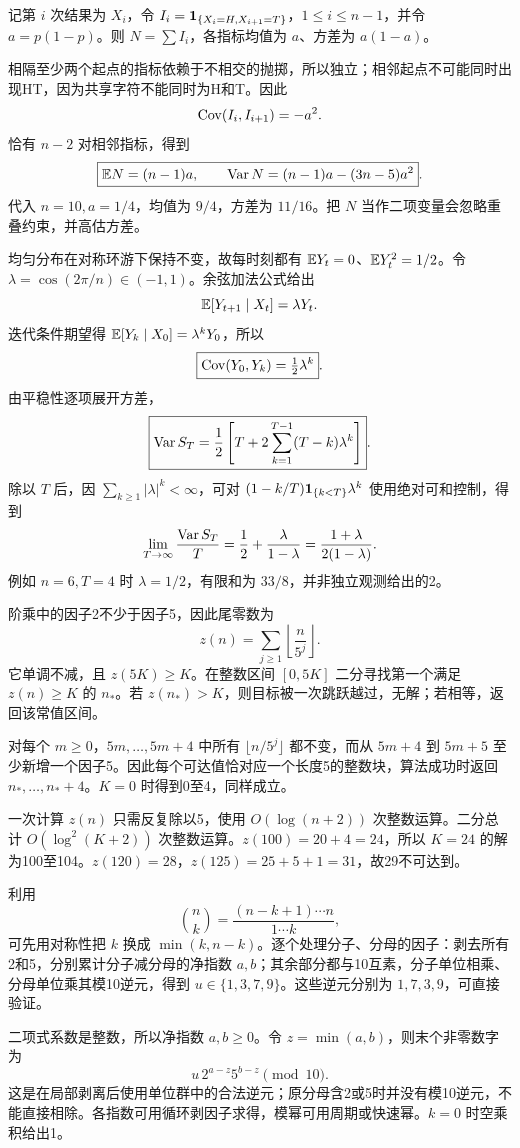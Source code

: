 记第 $i$ 次结果为 $X_i$，令 $I_i=\mathbf{1}_{\{X_i=H,X_{i+1}=T\}}$，$1\le i\le n-1$，并令 $a=p(1-p)$。则 $N=\sum I_i$，各指标均值为 $a$、方差为 $a(1-a)$。

相隔至少两个起点的指标依赖于不相交的抛掷，所以独立；相邻起点不可能同时出现HT，因为共享字符不能同时为H和T。因此
\[
\operatorname{Cov}(I_i,I_{i+1})=-a^2.
\]
恰有 $n-2$ 对相邻指标，得到
\[
\boxed{\mathbb{E} N=(n-1)a,\qquad
\operatorname{Var} N=(n-1)a-(3n-5)a^2}.
\]
代入 $n=10,a=1/4$，均值为 $9/4$，方差为 $11/16$。把 $N$ 当作二项变量会忽略重叠约束，并高估方差。

均匀分布在对称环游下保持不变，故每时刻都有 $\mathbb{E} Y_t=0$、$\mathbb{E} Y_t^2=1/2$。令 $\lambda=\cos(2\pi/n)\in(-1,1)$。余弦加法公式给出
\[
\mathbb{E}[Y_{t+1}\mid X_t]=\lambda Y_t.
\]
迭代条件期望得 $\mathbb{E}[Y_k\mid X_0]=\lambda^kY_0$，所以
\[
\boxed{\operatorname{Cov}(Y_0,Y_k)=\tfrac12\lambda^k}.
\]
由平稳性逐项展开方差，
\[
\boxed{\operatorname{Var} S_T=\frac12\left[T+
2\sum_{k=1}^{T-1}(T-k)\lambda^k\right]}.
\]
除以 $T$ 后，因 $\sum_{k\ge1}|\lambda|^k<\infty$，可对 $(1-k/T)\mathbf{1}_{\{k<T\}}\lambda^k$ 使用绝对可和控制，得到
\[
\lim_{T\to\infty}\frac{\operatorname{Var} S_T}{T}
=\frac12+\frac{\lambda}{1-\lambda}
=\frac{1+\lambda}{2(1-\lambda)}.
\]
例如 $n=6,T=4$ 时 $\lambda=1/2$，有限和为 $33/8$，并非独立观测给出的2。

阶乘中的因子2不少于因子5，因此尾零数为
\[
z(n)=\sum_{j\ge1}\left\lfloor\frac n{5^j}\right\rfloor.
\]
它单调不减，且 $z(5K)\ge K$。在整数区间 $[0,5K]$ 二分寻找第一个满足 $z(n)\ge K$ 的 $n_*$。若 $z(n_*)>K$，则目标被一次跳跃越过，无解；若相等，返回该常值区间。

对每个 $m\ge0$，$5m,\ldots,5m+4$ 中所有 $\lfloor n/5^j\rfloor$ 都不变，而从 $5m+4$ 到 $5m+5$ 至少新增一个因子5。因此每个可达值恰对应一个长度5的整数块，算法成功时返回 $n_*,\ldots,n_*+4$。$K=0$ 时得到0至4，同样成立。

一次计算 $z(n)$ 只需反复除以5，使用 $O(\log(n+2))$ 次整数运算。二分总计 $O(\log^2(K+2))$ 次整数运算。$z(100)=20+4=24$，所以 $K=24$ 的解为100至104。$z(120)=28$，$z(125)=25+5+1=31$，故29不可达到。

利用
\[
\binom nk=\frac{(n-k+1)\cdots n}{1\cdots k},
\]
可先用对称性把 $k$ 换成 $\min(k,n-k)$。逐个处理分子、分母的因子：剥去所有2和5，分别累计分子减分母的净指数 $a,b$；其余部分都与10互素，分子单位相乘、分母单位乘其模10逆元，得到 $u\in\{1,3,7,9\}$。这些逆元分别为 $1,7,3,9$，可直接验证。

二项式系数是整数，所以净指数 $a,b\ge0$。令 $z=\min(a,b)$，则末个非零数字为
\[
\boxed{u\,2^{a-z}5^{b-z}\pmod{10}}.
\]
这是在局部剥离后使用单位群中的合法逆元；原分母含2或5时并没有模10逆元，不能直接相除。各指数可用循环剥因子求得，模幂可用周期或快速幂。$k=0$ 时空乘积给出1。

